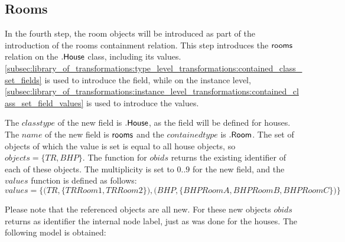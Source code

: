 \subsection{Rooms}
\label{subsec:application:building_the_model:rooms}

In the fourth step, the room objects will be introduced as part of the introduction of the rooms containment relation. This step introduces the $\mathsf{rooms}$ relation on the $.\mathsf{House}$ class, including its values. \cref{subsec:library_of_transformations:type_level_transformations:contained_class_set_fields} is used to introduce the field, while on the instance level, \cref{subsec:library_of_transformations:instance_level_transformations:contained_class_set_field_values} is used to introduce the values.

The $classtype$ of the new field is $.\mathsf{House}$, as the field will be defined for houses. The $name$ of the new field is $\mathsf{rooms}$ and the $containedtype$ is $.\mathsf{Room}$. The set of objects of which the value is set is equal to all house objects, so $objects = \{TR, BHP\}$. The function for $obids$ returns the existing identifier of each of these objects. The multiplicity is set to $0..9$ for the new field, and the $values$ function is defined as follows:
\begin{equation*}
    values = \big\{\big(TR, \{TRRoom1, TRRoom2\}\big), \big(BHP, \{BHPRoomA, BHPRoomB, BHPRoomC\}\big)\big\}
\end{equation*}

Please note that the referenced objects are all new. For these new objects $obids$ returns as identifier the internal node label, just as was done for the houses. The following model is obtained:


